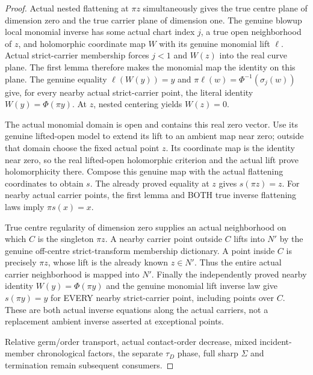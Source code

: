 \begin{proof}
Actual nested flattening at $\pi z$ simultaneously gives the true centre
plane of dimension zero and the true carrier plane of dimension one.
The genuine blowup local monomial inverse has some actual chart index
$j$, a true open neighborhood of $z$, and holomorphic coordinate map
$W$ with its genuine monomial lift $\ell$. Actual strict-carrier
membership forces $j<1$ and $W(z)$ into the real curve plane. The first
lemma therefore makes the monomial map the identity on this plane.
The genuine equality $\ell(W(y))=y$ and
$\pi\ell(w)=\Phi^{-1}(\sigma_j(w))$ give, for every nearby actual
strict-carrier point, the literal identity
$W(y)=\Phi(\pi y)$. At $z$, nested centering yields $W(z)=0$.

The actual monomial domain is open and contains this real zero vector.
Use its genuine lifted-open model to extend its lift to an ambient map
near zero; outside that domain choose the fixed actual point $z$.
Its coordinate map is the identity near zero, so the real lifted-open
holomorphic criterion and the actual lift prove holomorphicity there.
Compose this genuine map with the actual flattening coordinates to
obtain $s$. The already proved equality at $z$ gives $s(\pi z)=z$.
For nearby actual carrier points, the first lemma and BOTH true inverse
flattening laws imply $\pi s(x)=x$.

True centre regularity of dimension zero supplies an actual neighborhood
on which $C$ is the singleton $\pi z$. A nearby carrier point outside
$C$ lifts into $N'$ by the genuine off-centre strict-transform membership
dictionary. A point inside $C$ is precisely $\pi z$, whose lift is the
already known $z\in N'$. Thus the entire actual carrier neighborhood is
mapped into $N'$. Finally the independently proved nearby identity
$W(y)=\Phi(\pi y)$ and the genuine monomial lift inverse law give
$s(\pi y)=y$ for EVERY nearby strict-carrier point, including points over
$C$. These are both actual inverse equations along the actual carriers,
not a replacement ambient inverse asserted at exceptional points.

Relative germ/order transport, actual contact-order decrease, mixed
incident-member chronological factors, the separate $\tau_D$ phase,
full sharp $\Sigma$ and termination remain subsequent consumers.
\end{proof}
